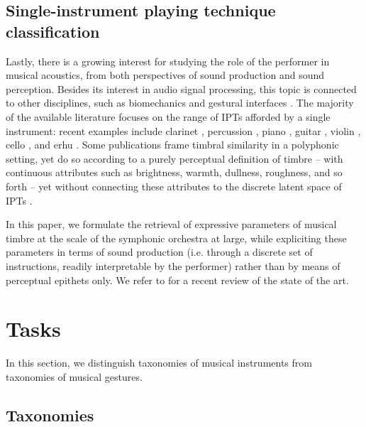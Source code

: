 \documentclass{article}
\makeatletter
\newcommand*{\ie}{i.e.\@\xspace}
\makeatother
\begin{document}
\subsection{Single-instrument playing technique classification}
Lastly, there is a growing interest for studying the role of the performer in musical acoustics, from both perspectives of sound production and sound perception.
Besides its interest in audio signal processing, this topic is connected to other disciplines, such as biomechanics and gestural interfaces \cite{metcalf2014frontiers}.
The majority of the available literature focuses on the range of IPTs afforded by a single instrument: recent examples include clarinet \cite{loureiro2004ismir}, percussion \cite{tindale2004ismir}, piano \cite{bernays2013smc}, guitar \cite{foulon2013cmmr,su2014ismir,chen2015ismir}, violin \cite{young2008nime}, cello \cite[chapter 6]{chudy2016phd}, and erhu \cite{yang2014fma}.
Some publications frame timbral similarity in a polyphonic setting, yet do so according to a purely perceptual definition of timbre -- with continuous attributes such as brightness, warmth, dullness, roughness, and so forth -- yet without connecting these attributes to the discrete latent space of IPTs \cite{antoine2018isma}.

In this paper, we formulate the retrieval of expressive parameters of musical timbre at the scale of the symphonic orchestra at large, while expliciting these parameters in terms of sound production (\ie{} through a discrete set of instructions, readily interpretable by the performer) rather than by means of perceptual epithets only.
We refer to \cite{leman2017chapter} for a recent review of the state of the art.


\section{Tasks}
In this section, we distinguish taxonomies of musical instruments from taxonomies of musical gestures.

\subsection{Taxonomies}
\end{document}
